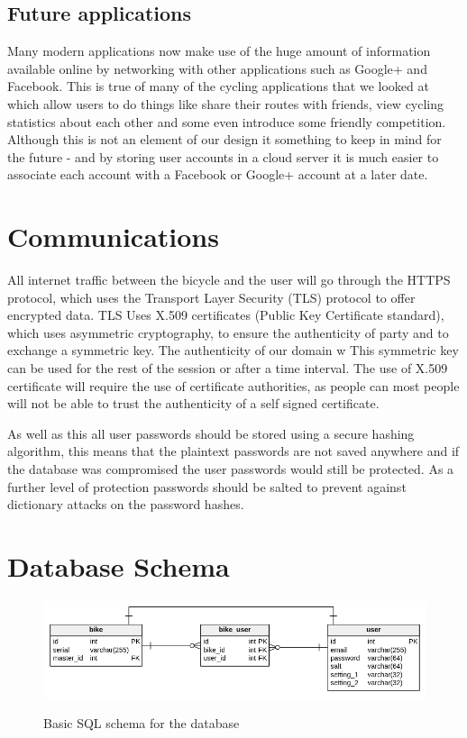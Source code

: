 \documentclass[a4paper]{report}
\begin{document}
{\subsection{Future applications}
Many modern applications now make use of the huge amount of information available online by networking with other applications such as Google+ and Facebook. This is true of many of the cycling applications that we looked at which allow users to do things like share their routes with friends, view cycling statistics about each other and some even introduce some friendly competition. Although this is not an element of our design it something to keep in mind for the future - and by storing user accounts in a cloud server it is much easier to associate each account with a Facebook or Google+ account at a later date.

\section{Communications}
All internet traffic between the bicycle and the user will go through the HTTPS protocol, which uses the Transport Layer Security (TLS) protocol to offer encrypted data. TLS Uses X.509 certificates (Public Key Certificate standard), which uses asymmetric cryptography, to ensure the authenticity of party and to exchange a symmetric key. The authenticity of our domain w This symmetric key can be used for the rest of the session or after a time interval. The use of X.509 certificate will require the use of  certificate authorities, as people can most people will not be able to trust the authenticity of a self signed certificate.

As well as this all user passwords should be stored using a secure hashing algorithm, this means that the plaintext passwords are not saved anywhere and if the database was compromised the user passwords would still be protected. As a further level of protection passwords should be salted to prevent against dictionary attacks on the password hashes.
\section{Database Schema}
\begin{figure}[h]
\centering
\includegraphics[scale=0.5]{figures/sql}
\label{fig:sql_schema}
\caption{Basic SQL schema for the database}
\end{figure}

}
\end{document}
